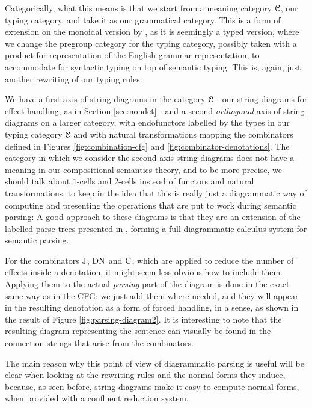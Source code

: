 Categorically, what this means is that we start from a meaning category $\mathcal{C}$,
our typing category, and take it as our grammatical category.
This is a form of extension on the monoidal version by
\cite{coeckeMathematicalFoundationsCompositional2010}, as it is seemingly a
typed version, where we change the pregroup category for the typing category,
possibly taken with a product for representation of the English grammar
representation, to accommodate for syntactic typing on top of semantic typing.
This is, again, just another rewriting of our typing rules.


We have a first axis of string diagrams in the category
$\mathcal{C}$ - our string diagrams for effect handling, as in Section
\ref{sec:nondet} - and a second \emph{orthogonal} axis of string diagrams
on a larger category, with endofunctors labelled
by the types in our typing category $\bar{\mathcal{C}}$ and
with natural transformations mapping the combinators defined in Figures
\ref{fig:combination-cfg} and \ref{fig:combinator-denotations}.
The category in which we consider the second-axis string diagrams does not have
a meaning in our compositional semantics theory, and to be more precise, we
should talk about $1$-cells and $2$-cells instead of functors and natural
transformations, to keep in the idea that this is really just a diagrammatic
way of computing and presenting the operations that are put to work during
semantic parsing:
A good approach to these diagrams is that they are an extension of the
labelled parse trees presented in
\cite{bumfordEffectdrivenInterpretationFunctors2025}, forming a full
diagrammatic calculus system for semantic parsing.

\smallskip

For the combinators $\text{J}$, $\text{DN}$ and $\text{C}$, which are applied to
reduce the number of effects inside a denotation, it might seem less obvious
how to include them.
Applying them to the actual \emph{parsing} part of the diagram is done
in the exact same way as in the CFG: we just add them where needed, and they
will appear in the resulting denotation as a form of forced handling, in a
sense, as shown in the result of Figure \ref{fig:parsing-diagram2}.
It is interesting to note that the resulting diagram representing
the sentence can visually be found in the connection strings that arise from
the combinators.

The main reason why this point of view of diagrammatic parsing is useful
will be clear when looking at the rewriting rules and the normal forms they
induce, because, as seen before, string diagrams make it easy to compute
normal forms, when provided with a confluent reduction system.

